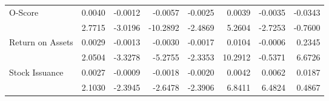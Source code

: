 \begin{table}[h]
{\begin{tabular}{@{}lrrrrrrr@{}}
\multirow{2}{*}{O-Score} & 0.0040 & -0.0012 & -0.0057 & -0.0025 & 0.0039 & -0.0035 & -0.0343 \\
& 2.7715 & -3.0196 & -10.2892 & -2.4869 & 5.2604 & -2.7253 & -0.7600 \\
\multirow{2}{*}{Return on Assets} & 0.0029 & -0.0013 & -0.0030 & -0.0017 & 0.0104 & -0.0006 & 0.2345 \\
& 2.0504 & -3.3278 & -5.2755 & -2.3353 & 10.2912 & -0.5371 & 6.6726 \\
\multirow{2}{*}{Stock Issuance} & 0.0027 & -0.0009 & -0.0018 & -0.0020 & 0.0042 & 0.0062 & 0.0187 \\
& 2.1030 & -2.3945 & -2.6478 & -2.3906 & 6.8411 & 6.4824 & 0.4867 \\ \bottomrule
\end{tabular}%
}
\end{table}
